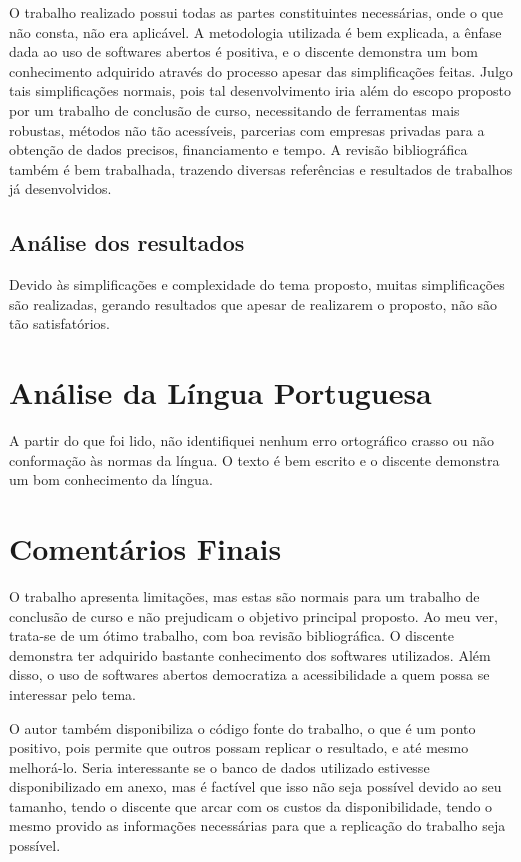 \documentclass[
    article,
    12pt,
    a4paper,
    english,
    brazil,
    sumario=tradicional
]{/home/lucas_galdino/Desktop/TCC/planning/abntex2/abntex2}
\begin{document}
O trabalho realizado possui todas as partes constituintes necessárias, onde o que não consta, não era aplicável. A metodologia utilizada é bem explicada, a ênfase dada ao uso de softwares abertos é positiva, e o discente demonstra um bom conhecimento adquirido através do processo apesar das simplificações feitas. Julgo tais simplificações normais, pois tal desenvolvimento iria além do escopo proposto por um trabalho de conclusão de curso, necessitando de ferramentas mais robustas, métodos não tão acessíveis, parcerias com empresas privadas para a obtenção de dados precisos, financiamento e tempo. A revisão bibliográfica também é bem trabalhada, trazendo diversas referências e resultados de trabalhos já desenvolvidos.\par

\subsection{Análise dos resultados}

Devido às simplificações e complexidade do tema proposto, muitas simplificações são realizadas, gerando resultados que apesar de realizarem o proposto, não são tão satisfatórios.\par

\section{Análise da Língua Portuguesa}

A partir do que foi lido, não identifiquei nenhum erro ortográfico crasso ou não conformação às normas da língua. O texto é bem escrito e o discente demonstra um bom conhecimento da língua.

\section{Comentários Finais}
O trabalho apresenta limitações, mas estas são normais para um trabalho de conclusão de curso
e não prejudicam o objetivo principal proposto.\newline
Ao meu ver, trata-se de um ótimo trabalho, com boa revisão bibliográfica. O discente demonstra
ter adquirido bastante conhecimento dos softwares utilizados.\newline
Além disso, o uso de softwares abertos democratiza a acessibilidade a quem possa se interessar pelo tema.\par

O autor também disponibiliza o código fonte do trabalho,
o que é um ponto positivo, pois permite que outros possam replicar o resultado,
e até mesmo melhorá-lo. Seria interessante se o banco de dados
utilizado estivesse disponibilizado em anexo, mas é factível que isso não seja possível
devido ao seu tamanho, tendo o discente que arcar com os custos da disponibilidade, tendo o mesmo provido as
informações necessárias para que a replicação do trabalho seja possível.\par


\end{document}
